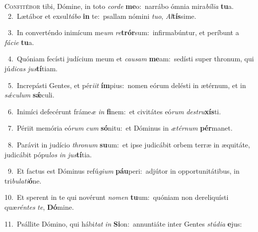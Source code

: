 \lettrine{\initial\textcolor{\initialcolor}{C}}{onfitébor} tibi, Dómine, in toto \textit{cor}\-\textit{de} \textbf{me}\-o:~\star narrábo ómnia mira\-\textit{bí}\-\textit{li}\textit{a} \textbf{tu}\-a.\\
{\numbfont\textcolor{\numbcolor}{~2.}}~Lætábor et exsul\-\textit{tá}\-\textit{bo} \textbf{in} te:~\star psallam nómini \textit{tu}\-\textit{o}, \textit{Al}\-\textbf{tís}sime.\par
{\numbfont\textcolor{\numbcolor}{~3.}}~In converténdo inimícum me\textit{um} \textit{re}\-\textbf{trór}sum:~\star infirmabúntur, et períbunt a \textit{fá}\-\textit{ci}\textit{e} \textbf{tu}\-a.\par
{\numbfont\textcolor{\numbcolor}{~4.}}~Quóniam fecísti judícium meum et \textit{cau}\-\textit{sam} \textbf{me}\-am:~\star sedísti super thronum, qui jú\-\textit{di}\-\textit{cas} \textit{jus}\-\textbf{tí}tiam.\par
{\numbfont\textcolor{\numbcolor}{~5.}}~Increpásti Gentes, et pér\-\textit{i}\-\textit{it} \textbf{ím}\-pius:~\star nomen eórum delésti in ætérnum, et in \textit{sǽ}\-\textit{cu}\textit{lum} \textbf{sǽ}\-culi.\par
{\numbfont\textcolor{\numbcolor}{~6.}}~Inimíci defecérunt fráme\textit{æ} \textit{in} \textbf{fi}\-nem:~\star et civitátes eó\textit{rum} \textit{de}\-\textit{stru}\textbf{xís}ti.\par
{\numbfont\textcolor{\numbcolor}{~7.}}~Périit memória eó\textit{rum} \textit{cum} \textbf{só}\-nitu:~\star et Dóminus in \textit{æ}\-\textit{tér}\textit{num} \textbf{pér}\-manet.\par
{\numbfont\textcolor{\numbcolor}{~8.}}~Parávit in judício \textit{thro}\-\textit{num} \textbf{su}\-um:~\star et ipse judicábit orbem terræ in æquitáte, judicábit pópu\textit{los} \textit{in} \textit{jus}\-\textbf{tí}tia.\par
{\numbfont\textcolor{\numbcolor}{~9.}}~Et factus est Dóminus refú\-\textit{gi}\-\textit{um} \textbf{páu}\-peri:~\star adjútor in opportunitátibus, in tri\-\textit{bu}\-\textit{la}\textit{ti}\textbf{ó}ne.\par
{\numbfont\textcolor{\numbcolor}{10.}}~Et sperent in te qui novérunt \textit{no}\-\textit{men} \textbf{tu}\-um:~\star quóniam non dereliquísti quæ\-\textit{rén}\-\textit{tes} \textit{te}\-, \textbf{Dó}\-mine.\par
{\numbfont\textcolor{\numbcolor}{11.}}~Psállite Dómino, qui hábi\textit{tat} \textit{in} \textbf{Si}\-on:~\star annuntiáte inter Gentes \textit{stú}\-\textit{di}\textit{a} \textbf{e}\-jus:\par
